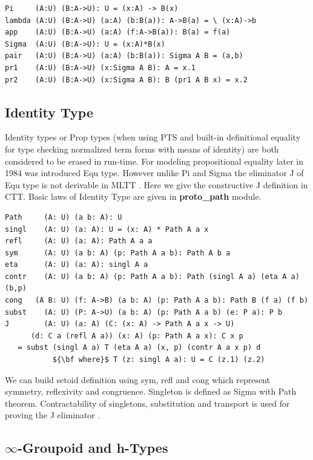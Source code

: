 \documentclass{article}
\begin{document}
\begin{lstlisting}[mathescape=true]
Pi     (A:U) (B:A->U): U = (x:A) -> B(x)
lambda (A:U) (B:A->U) (a:A) (b:B(a)): A->B(a) = \ (x:A)->b
app    (A:U) (B:A->U) (a:A) (f:A->B(a)): B(a) = f(a)
Sigma  (A:U) (B:A->U): U = (x:A)*B(x)
pair   (A:U) (B:A->U) (a:A) (b:B(a)): Sigma A B = (a,b)
pr1    (A:U) (B:A->U) (x:Sigma A B): A = x.1
pr2    (A:U) (B:A->U) (x:Sigma A B): B (pr1 A B x) = x.2
\end{lstlisting}

\subsection{Identity Type}

Identity types or Prop types (when using PTS and built-in definitional equality for type checking
normalized term forms with means of identity) are both considered to be erased in run-time.
For modeling propositional equality later in 1984 was introduced Equ type. \cite{Lof84}
However unlike Pi and Sigma the eliminator J of Equ type is
not derivable in MLTT \cite{Hofmann96, Mortberg17, HoTT}.
Here we give the constructive J definition in CTT. Basic laws of Identity Type
are given in {\bf proto\_path} module.

\begin{lstlisting}[mathescape=true]
Path     (A: U) (a b: A): U
singl    (A: U) (a: A): U = (x: A) * Path A a x
refl     (A: U) (a: A): Path A a a
sym      (A: U) (a b: A) (p: Path A a b): Path A b a
eta      (A: U) (a: A): singl A a
contr    (A: U) (a b: A) (p: Path A a b): Path (singl A a) (eta A a) (b,p)
cong   (A B: U) (f: A->B) (a b: A) (p: Path A a b): Path B (f a) (f b)
subst    (A: U) (P: A->U) (a b: A) (p: Path A a b) (e: P a): P b
J        (A: U) (a: A) (C: (x: A) -> Path A a x -> U)
      (d: C a (refl A a)) (x: A) (p: Path A a x): C x p
   = subst (singl A a) T (eta A a) (x, p) (contr A a x p) d
           ${\bf where}$ T (z: singl A a): U = C (z.1) (z.2)
\end{lstlisting}

We can build setoid \cite{Bishop67} definition using sym, refl and cong which
represent symmetry, reflexivity and congruence.
Singleton is defined as Sigma with Path theorem. Contractability of singletons,
substitution and transport is used for proving the J eliminator \cite{HoTT}.

\subsection{$\infty$-Groupoid and h-Types}
\end{document}
